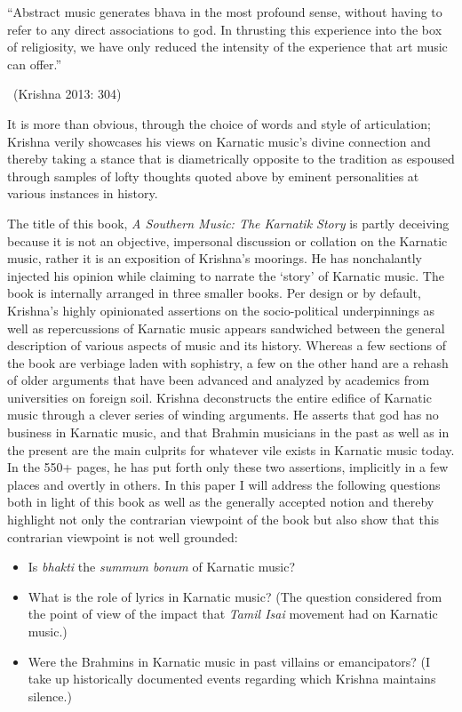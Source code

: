 \begin{myquote}
“Abstract music generates bhava in the most profound sense, without having to refer to any direct associations to god. In thrusting this experience into the box of religiosity, we have only reduced the intensity of the experience that art music can offer.” 

~\hfill (Krishna 2013: 304)
\end{myquote}

It is more than obvious, through the choice of words and style of articulation; Krishna verily showcases his views on Karnatic music’s divine connection and thereby taking a stance that is diametrically opposite to the tradition as espoused through samples of lofty thoughts quoted above by eminent personalities at various instances in history.

The title of this book, \textit{A Southern Music: The Karnatik Story} is partly deceiving because it is not an objective, impersonal discussion or collation on the Karnatic music, rather it is an exposition of Krishna’s moorings. He has nonchalantly injected his opinion while claiming to narrate the ‘story’ of Karnatic music. The book is internally arranged in three smaller books. Per design or by default, Krishna’s highly opinionated assertions on the socio-political underpinnings as well as repercussions of Karnatic music appears sandwiched between the general description of various aspects of music and its history. Whereas a few sections of the book are verbiage laden with sophistry, a few on the other hand are a rehash of older arguments that have been advanced and analyzed by academics from universities on foreign soil. Krishna deconstructs the entire edifice of Karnatic music through a clever series of winding arguments. He asserts that god has no business in Karnatic music, and that Brahmin musicians in the past as well as in the present are the main culprits for whatever vile exists in Karnatic music today. In the 550+ pages, he has put forth only these two assertions, implicitly in a few places and overtly in others. In this paper I will address the following questions both in light of this book as well as the generally accepted notion and thereby highlight not only the contrarian viewpoint of the book but also show that this contrarian viewpoint is not well grounded:

\begin{itemize}
\itemsep=0pt
\item Is \textit{bhakti} the \textit{summum bonum} of Karnatic music?

 \item What is the role of lyrics in Karnatic music? (The question considered from the point of view of the impact that \textit{Tamil Isai} movement had on Karnatic music.)

 \item Were the Brahmins in Karnatic music in past villains or emancipators? (I take up historically documented events regarding which Krishna maintains silence.)

\end{itemize}


